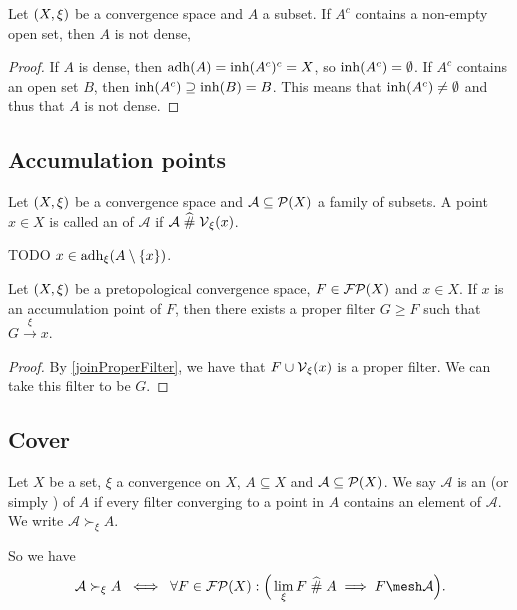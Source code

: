 \begin{lemma} \label{openDensityLemma}
Let $\left( X, \xi \right)$ be a convergence space and $A$ a subset.
If $A^c$ contains a non-empty open set, then $A$ is not dense,
\end{lemma}
\begin{proof}
If $A$ is dense, then $\operatorname{adh}(A) = \operatorname{inh}(A^c)^c = X$, so $\operatorname{inh}(A^c) = \emptyset$. If $A^c$ contains an open set $B$, then $\operatorname{inh}(A^c) \supseteq \operatorname{inh}(B) = B$. This means that $\operatorname{inh}(A^c) \neq \emptyset$ and thus that $A$ is not dense.
\end{proof}

\subsection{Accumulation points}
\begin{definition}
Let $\left( X,\xi \right)$ be a convergence space and $\mathcal{A}\subseteq \operatorname{\mathcal{P}}(X)$ a family of subsets. A point $x\in X$ is called an  of $\mathcal{A}$ if $\mathcal{A}\mathrel{\widehat{\#}} \operatorname{\mathcal{V}}_\xi(x)$.
\end{definition}

TODO $x\in \operatorname{adh}_\xi(A\setminus\{x\})$.

\begin{proposition} \label{subfilterToAccumulationPoint}
Let $\left( X,\xi \right)$ be a pretopological convergence space, $F\in\operatorname{\mathcal{FP}}(X)$ and $x\in X$. If $x$ is an accumulation point of $F$, then there exists a proper filter $G \geq F$ such that $G\overset{\xi}{\longrightarrow} x$. 
\end{proposition}
\begin{proof}
By \ref{joinProperFilter}, we have that $F\cup \operatorname{\mathcal{V}}_\xi(x)$ is a proper filter. We can take this filter to be $G$.
\end{proof}

\subsection{Cover}
\begin{definition}
Let $X$ be a set, $\xi$ a convergence on $X$, $A\subseteq X$ and $\mathcal{A}\subseteq \operatorname{\mathcal{P}}(X)$.
We say $\mathcal{A}$ is an  (or simply ) of $A$ if every filter converging to a point in $A$ contains an element of $\mathcal{A}$. We write $\mathcal{A} \succ_\xi A$.
\end{definition}
So we have
\[ \mathcal{A} \succ_\xi A \;\iff\; \forall F\in \powerfilters(X): \Big( \lim_\xi F \amesh A \implies F \mesh \mathcal{A} \Big). \]

